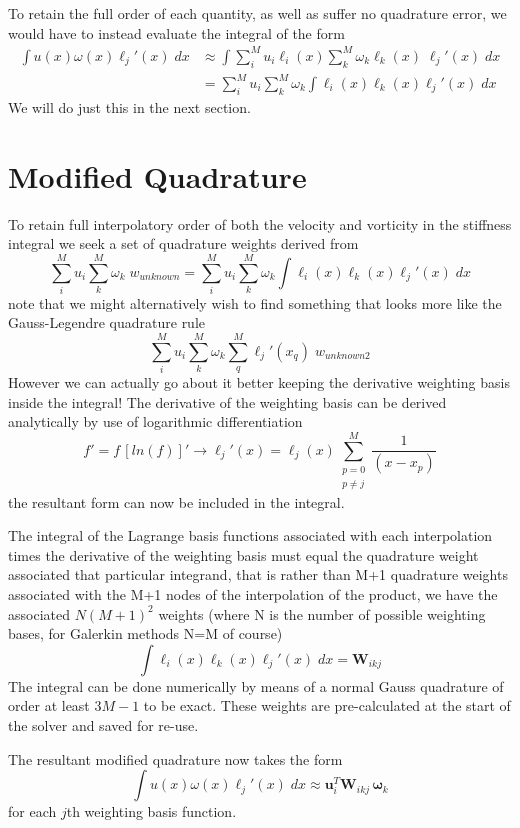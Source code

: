 \documentclass[letterpaper,12pt]{report}
\newcommand{\be}{\begin{equation}}
\newcommand{\ben}[1]{\begin{equation}\label{#1}}
\newcommand{\ee}{\end{equation}}
\begin{document}
To retain the full order of each quantity, as well as suffer no quadrature error, we would have to instead evaluate the integral of the form
\be \begin{split}\int u(x) \omega(x) \ell_j'(x) \;dx &\approx \int \sum_i^M u_i \ell_i(x) \sum_k^M \omega_k \ell_k(x) \;\ell_j'(x) \;dx\\
&=\sum_i^M u_i \sum_k^M \omega_k \int \ell_i(x) \ell_k(x) \ell_j'(x) \;dx
\end{split}\ee
We will do just this in the next section.
%
\section{Modified Quadrature}
To retain full interpolatory order of both the velocity and vorticity in the stiffness integral we seek a set of quadrature weights derived from
\be \sum_i^M u_i \sum_k^M \omega_k \;w_{unknown} = \sum_i^M u_i \sum_k^M \omega_k \int \ell_i(x) \ell_k(x) \ell_j'(x) \;dx \ee
note that we might alternatively wish to find something that looks more like the Gauss-Legendre quadrature rule
\be \sum_i^M u_i \sum_k^M \omega_k \sum_q^M \ell_j'(x_q) \;w_{unknown2} \ee
However we can actually go about it better keeping the derivative weighting basis inside the integral!
The derivative of the weighting basis can be derived analytically by use of logarithmic differentiation
\be f' = f \, [ln(f)]' \rightarrow \ell_j'(x)=\ell_j(x) \sum_{\substack{p=0\\ p\neq j}}^M \frac{1}{(x-x_p)} \ee
the resultant form can now be included in the integral.

The integral of the Lagrange basis functions associated with each interpolation times the derivative of the weighting basis must equal the quadrature weight associated that particular integrand, that is rather than M+1  quadrature weights associated with the M+1 nodes of the interpolation of the product, we have the associated $N(M+1)^2$ weights (where N is the number of possible weighting bases, for Galerkin methods N=M of course)
\be \int \ell_i(x) \ell_k(x) \ell_j'(x) \;dx = \mathbf{W}_{ikj} \ee
The integral can be done numerically by means of a normal Gauss quadrature of order at least $3M-1$ to be exact. These weights are pre-calculated at the start of the solver and saved for re-use.

The resultant modified quadrature now takes the form
\ben{modQuad} \int u(x) \omega(x) \ell_j'(x) \;dx \approx \mathbf{u}_i^T \mathbf{W}_{ikj} \, \boldsymbol{\omega}_k \ee
for each $j$th weighting basis function.
\end{document}
